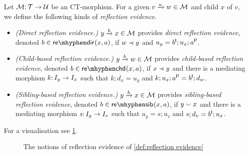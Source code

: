 \begin{definition}\label{def:reflection evidence}
Let ${\mathcal{M}}{:}\, {\mathcal{T}}\rightarrow{\mathcal{U}}$ be an CT-morphism. For a given $\trip vaw\in\cM$ and child $x$ of $v$, we define the following kinds of \emph{reflection evidence}.
\begin{itemize}[topsep=\smallskipamount]
\item \emph{(Direct reflection evidence.)} $\trip ybx\in\cM$ provides \emph{direct reflection evidence}, denoted $\isredir b{x,a}$, if $w\parentof y$ and $u_y=b^{\mathsf I};u_x;a^{\mathsf P}$.
\item \emph{(Child-based reflection evidence.)} $\trip ybw\in\cM$ provides \emph{child-based reflection evidence}, denoted $\isrechd b{x,a}$, if $x\parentof y$ and there is a mediating morphism $k{:}\, I_y\rightarrow I_x$ such that $k;d_x=u_y$ and $k;u_x;a^{\mathsf P}=b^{\mathsf I};d_w$.
\item \emph{(Sibling-based reflection evidence.)} $\trip ybx\in\cM$ provides \emph{sibling-based reflection evidence}, denoted $\isresib b{x,a}$, if $y\smallsmile x$ and there is a mediating morphism $s{:}\, I_y\rightarrow I_v$ such that $u_y=s;u_v$ and $s;d_v=b^{\mathsf I};u_x$.
\end{itemize}
\end{definition}
%
For a visualisation see \cref{fig:reflection evidence}.
%
\begin{figure}
	
	\caption{The notions of reflection evidence of \cref{def:reflection evidence}}
	\label{fig:reflection evidence}
\end{figure}

